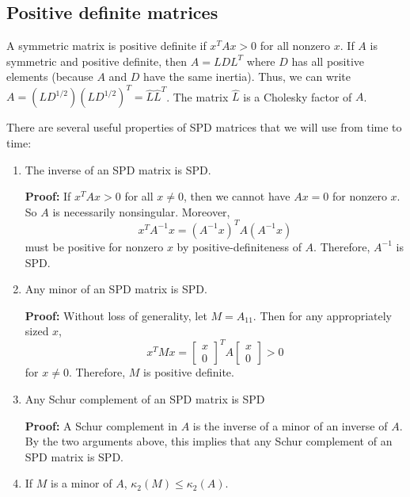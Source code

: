 \subsection{Positive definite matrices}

A symmetric matrix is positive definite if $x^T A x > 0$ for all
nonzero $x$.  If $A$ is symmetric and positive definite, then $A =
LDL^T$ where $D$ has all positive elements (because $A$ and $D$ have
the same inertia).  Thus, we can write $A = (LD^{1/2})(LD^{1/2})^T =
\hat{L} \hat{L}^T$.  The matrix $\hat{L}$ is a Cholesky factor of $A$.

There are several useful properties of SPD matrices that we will
use from time to time:
\begin{enumerate}
\item
  The inverse of an SPD matrix is SPD.

  {\bf Proof:}
  If $x^T A x > 0$ for all $x \neq 0$, then we cannot have $Ax = 0$
  for nonzero $x$.  So $A$ is necessarily nonsingular.  Moreover,
  \[
    x^T A^{-1} x = (A^{-1} x)^T A (A^{-1} x)
  \]
  must be positive for nonzero $x$ by positive-definiteness of $A$.
  Therefore, $A^{-1}$ is SPD.

\item
  Any minor of an SPD matrix is SPD.

  {\bf Proof:}
  Without loss of generality, let $M = A_{11}$.  Then for any appropriately
  sized $x$,
  \[
    x^T M x = \begin{bmatrix} x \\ 0 \end{bmatrix}^T A \begin{bmatrix} x \\ 0 \end{bmatrix} > 0
  \]
  for $x \neq 0$.  Therefore, $M$ is positive definite.

\item
  Any Schur complement of an SPD matrix is SPD

  {\bf Proof:}
  A Schur complement in $A$ is the inverse of a minor of an inverse of $A$.
  By the two arguments above, this implies that any Schur complement of
  an SPD matrix is SPD.

\item If $M$ is a minor of $A$, $\kappa_2(M) \leq \kappa_2(A)$.


\end{enumerate}
